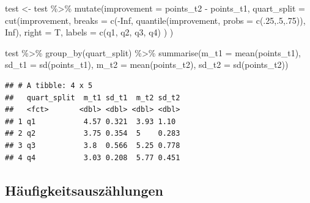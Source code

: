 \documentclass[
]{book}
\newenvironment{Shaded}{\begin{snugshade}}{\end{snugshade}}
\newcommand{\AttributeTok}[1]{\textcolor[rgb]{0.77,0.63,0.00}{#1}}
\newcommand{\ConstantTok}[1]{\textcolor[rgb]{0.00,0.00,0.00}{#1}}
\newcommand{\DecValTok}[1]{\textcolor[rgb]{0.00,0.00,0.81}{#1}}
\newcommand{\FunctionTok}[1]{\textcolor[rgb]{0.00,0.00,0.00}{#1}}
\newcommand{\NormalTok}[1]{#1}
\newcommand{\OtherTok}[1]{\textcolor[rgb]{0.56,0.35,0.01}{#1}}
\newcommand{\SpecialCharTok}[1]{\textcolor[rgb]{0.00,0.00,0.00}{#1}}
\newcommand{\StringTok}[1]{\textcolor[rgb]{0.31,0.60,0.02}{#1}}
\begin{document}
\begin{Shaded}
\begin{Highlighting}[]
\NormalTok{test }\OtherTok{\textless{}{-}}\NormalTok{ test }\SpecialCharTok{\%\textgreater{}\%}
  \FunctionTok{mutate}\NormalTok{(}\AttributeTok{improvement =}\NormalTok{ points\_t2 }\SpecialCharTok{{-}}\NormalTok{ points\_t1,}
         \AttributeTok{quart\_split =} \FunctionTok{cut}\NormalTok{(improvement,}
                           \AttributeTok{breaks =} \FunctionTok{c}\NormalTok{(}\SpecialCharTok{{-}}\ConstantTok{Inf}\NormalTok{,}
                                      \FunctionTok{quantile}\NormalTok{(improvement,}
                                               \AttributeTok{probs =} \FunctionTok{c}\NormalTok{(.}\DecValTok{25}\NormalTok{,.}\DecValTok{5}\NormalTok{,.}\DecValTok{75}\NormalTok{)),}
                                      \ConstantTok{Inf}\NormalTok{),}
                           \AttributeTok{right =}\NormalTok{ T,}
                           \AttributeTok{labels =} \FunctionTok{c}\NormalTok{(}\StringTok{\textquotesingle{}q1\textquotesingle{}}\NormalTok{, }\StringTok{\textquotesingle{}q2\textquotesingle{}}\NormalTok{, }\StringTok{\textquotesingle{}q3\textquotesingle{}}\NormalTok{, }\StringTok{\textquotesingle{}q4\textquotesingle{}}\NormalTok{)}
\NormalTok{                           )}
\NormalTok{         ) }

\NormalTok{test }\SpecialCharTok{\%\textgreater{}\%} 
  \FunctionTok{group\_by}\NormalTok{(quart\_split) }\SpecialCharTok{\%\textgreater{}\%} 
  \FunctionTok{summarise}\NormalTok{(}\AttributeTok{m\_t1 =} \FunctionTok{mean}\NormalTok{(points\_t1),}
            \AttributeTok{sd\_t1 =} \FunctionTok{sd}\NormalTok{(points\_t1),}
            \AttributeTok{m\_t2 =} \FunctionTok{mean}\NormalTok{(points\_t2),}
            \AttributeTok{sd\_t2 =} \FunctionTok{sd}\NormalTok{(points\_t2))}
\end{Highlighting}
\end{Shaded}

\begin{verbatim}
## # A tibble: 4 x 5
##   quart_split  m_t1 sd_t1  m_t2 sd_t2
##   <fct>       <dbl> <dbl> <dbl> <dbl>
## 1 q1           4.57 0.321  3.93 1.10 
## 2 q2           3.75 0.354  5    0.283
## 3 q3           3.8  0.566  5.25 0.778
## 4 q4           3.03 0.208  5.77 0.451
\end{verbatim}

\hypertarget{huxe4ufigkeitsauszuxe4hlungen}{%
\subsection{Häufigkeitsauszählungen}\label{huxe4ufigkeitsauszuxe4hlungen}}
\end{document}
